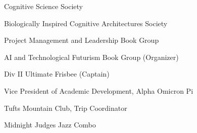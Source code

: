 \documentclass[]{csaund_resume-openfont}
\begin{document}
\descript{ }
\begin{tightemize}
\item Cognitive Science Society
\item Biologically Inspired Cognitive Architectures Society
\item Project Management and Leadership Book Group 
\item AI and Technological Futurism Book Group (Organizer)
\item Div II Ultimate Frisbee (Captain)
\end{tightemize}
\begin{tightemize}
\item Vice President of Academic Development, Alpha Omicron Pi
\item Tufts Mountain Club, Trip Coordinator
\item Midnight Judges Jazz Combo
\end{tightemize}
\sectionsep
\end{document}
